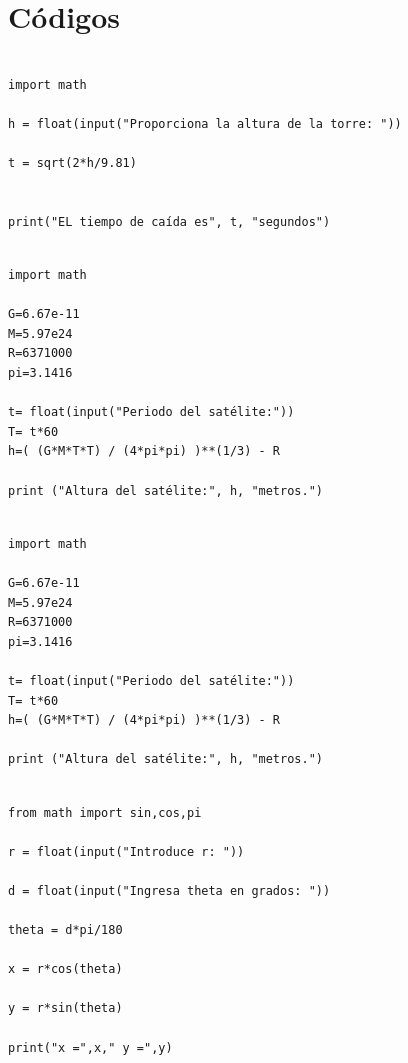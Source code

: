 \documentclass[11pt,spanish]{article}
\begin{document}
\section*{Códigos}
\begin{lstlisting}[caption=caida.py] 

import math 

h = float(input("Proporciona la altura de la torre: "))

t = sqrt(2*h/9.81)


print("EL tiempo de caída es", t, "segundos")

\end{lstlisting}



\begin{lstlisting}[caption=altura.py] 

import math

G=6.67e-11
M=5.97e24
R=6371000
pi=3.1416

t= float(input("Periodo del satélite:"))
T= t*60
h=( (G*M*T*T) / (4*pi*pi) )**(1/3) - R

print ("Altura del satélite:", h, "metros.")

\end{lstlisting}


\begin{lstlisting}[caption=altura.py] 

import math

G=6.67e-11
M=5.97e24
R=6371000
pi=3.1416

t= float(input("Periodo del satélite:"))
T= t*60
h=( (G*M*T*T) / (4*pi*pi) )**(1/3) - R

print ("Altura del satélite:", h, "metros.")

\end{lstlisting}



\begin{lstlisting}[caption=Polar.py] 

from math import sin,cos,pi

r = float(input("Introduce r: "))

d = float(input("Ingresa theta en grados: "))

theta = d*pi/180

x = r*cos(theta)

y = r*sin(theta)

print("x =",x," y =",y)

\end{lstlisting}
\end{document}
